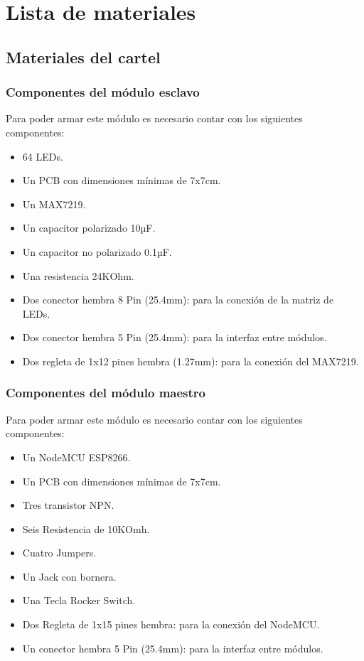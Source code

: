 \section{Lista de materiales}\label{sec:materiales}

\subsection{Materiales del cartel}

\subsubsection{Componentes del módulo esclavo}
Para poder armar este módulo es necesario contar con los siguientes componentes:
\begin{itemize}
    \item 64 LEDs.
    \item Un PCB con dimensiones mínimas de 7x7cm.
    \item Un MAX7219.
    \item Un capacitor polarizado 10µF.
    \item Un capacitor no polarizado 0.1µF.
    \item Una resistencia 24KOhm.
    \item Dos conector hembra 8 Pin (25.4mm): para la conexión de la matriz de LEDs.
    \item Dos conector hembra 5 Pin (25.4mm): para la interfaz entre módulos.
    \item Dos regleta de 1x12 pines hembra (1.27mm): para la conexión del MAX7219.
\end{itemize}    

\subsubsection{Componentes del módulo maestro}
Para poder armar este módulo es necesario contar con los siguientes componentes:
\begin{itemize}
    \item Un NodeMCU ESP8266.
    \item Un PCB con dimensiones mínimas de 7x7cm.
    \item Tres transistor NPN.
    \item Seis Resistencia de 10KOmh.
    \item Cuatro Jumpers.
    \item Un Jack con bornera.
    \item Una Tecla Rocker Switch.
    \item Dos Regleta de 1x15 pines hembra: para la conexión del NodeMCU.
    \item Un conector hembra 5 Pin (25.4mm): para la interfaz entre módulos.
\end{itemize}

